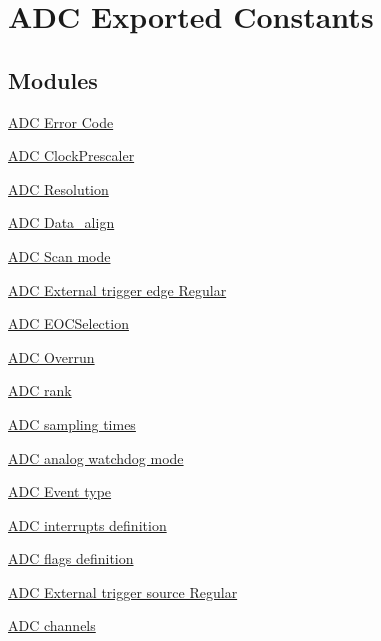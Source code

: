 \hypertarget{group___a_d_c___exported___constants}{}\section{A\+DC Exported Constants}
\label{group___a_d_c___exported___constants}
\subsection*{Modules}
\begin{DoxyCompactItemize}
\item 
\hyperlink{group___a_d_c___error___code}{A\+D\+C Error Code}
\item 
\hyperlink{group___a_d_c___clock_prescaler}{A\+D\+C Clock\+Prescaler}
\item 
\hyperlink{group___a_d_c___resolution}{A\+D\+C Resolution}
\item 
\hyperlink{group___a_d_c___data__align}{A\+D\+C Data\+\_\+align}
\item 
\hyperlink{group___a_d_c___scan__mode}{A\+D\+C Scan mode}
\item 
\hyperlink{group___a_d_c___external__trigger__edge___regular}{A\+D\+C External trigger edge Regular}
\item 
\hyperlink{group___a_d_c___e_o_c_selection}{A\+D\+C E\+O\+C\+Selection}
\item 
\hyperlink{group___a_d_c___overrun}{A\+D\+C Overrun}
\item 
\hyperlink{group___a_d_c__rank}{A\+D\+C rank}
\item 
\hyperlink{group___a_d_c__sampling__times}{A\+D\+C sampling times}
\item 
\hyperlink{group___a_d_c__analog__watchdog__mode}{A\+D\+C analog watchdog mode}
\item 
\hyperlink{group___a_d_c___event__type}{A\+D\+C Event type}
\item 
\hyperlink{group___a_d_c__interrupts__definition}{A\+D\+C interrupts definition}
\item 
\hyperlink{group___a_d_c__flags__definition}{A\+D\+C flags definition}
\item 
\hyperlink{group___a_d_c___external__trigger__source___regular}{A\+D\+C External trigger source Regular}
\item 
\hyperlink{group___a_d_c__channels}{A\+D\+C channels}
\end{DoxyCompactItemize}
